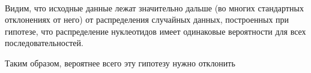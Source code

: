 \documentclass[11pt]{article}
\begin{document}
    \begin{center}
    \end{center}
    { \hspace*{\fill} \\}
    
    Видим, что исходные данные лежат значительно дальше (во многих
стандартных отклонениях от него) от распределения случайных данных,
построенных при гипотезе, что распределение нуклеотидов имеет одинаковые
вероятности для всех последовательностей.

Таким образом, вероятнее всего эту гипотезу нужно отклонить


    
    
    
    
\end{document}
